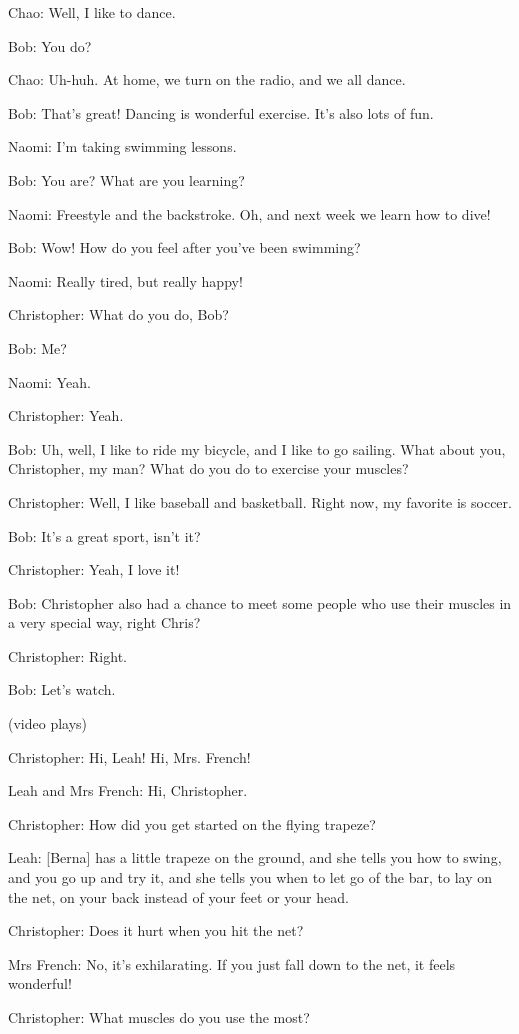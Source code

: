 Chao: Well, I like to dance.

Bob: You do?

Chao: Uh-huh. At home, we turn on the radio, and we all dance.

Bob: That's great! Dancing is wonderful exercise. It's also lots of fun.

Naomi: I'm taking swimming lessons.

Bob: You are? What are you learning?

Naomi: Freestyle and the backstroke. Oh, and next week we learn how to dive!

Bob: Wow! How do you feel after you've been swimming?

Naomi: Really tired, but really happy!

Christopher: What do you do, Bob?

Bob: Me?

Naomi: Yeah.

Christopher: Yeah.

Bob: Uh, well, I like to ride my bicycle, and I like to go sailing. What about you, Christopher, my man? What do you do to exercise your muscles?

Christopher: Well, I like baseball and basketball. Right now, my favorite is soccer.

Bob: It's a great sport, isn't it?

Christopher: Yeah, I love it!

Bob: Christopher also had a chance to meet some people who use their muscles in a very special way, right Chris?

Christopher: Right.

Bob: Let's watch.

(video plays)

Christopher: Hi, Leah! Hi, Mrs. French!

Leah and Mrs French: Hi, Christopher.

Christopher: How did you get started on the flying trapeze?

Leah: [Berna] has a little trapeze on the ground, and she tells you how to swing, and you go up and try it, and she tells you when to let go of the bar, to lay on the net, on your back instead of your feet or your head.

Christopher: Does it hurt when you hit the net?

Mrs French: No, it's exhilarating. If you just fall down to the net, it feels wonderful!

Christopher: What muscles do you use the most?

